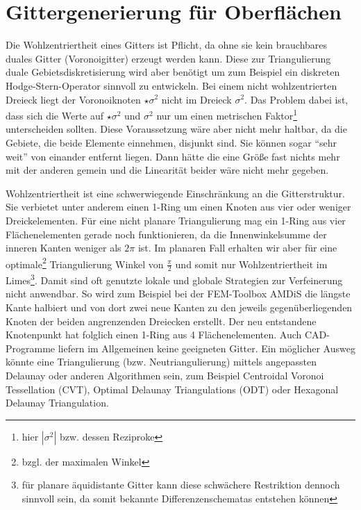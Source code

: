 \section{Gittergenerierung für Oberflächen}


  \begin{ziel}
    Die Wohlzentriertheit eines Gitters ist Pflicht, da ohne sie kein brauchbares duales Gitter (Voronoigitter) erzeugt werden kann. 
    Diese zur Triangulierung duale Gebietsdiskretisierung wird aber benötigt um zum Beispiel ein diskreten Hodge-Stern-Operator sinnvoll zu entwickeln. 
    Bei einem nicht wohlzentrierten Dreieck liegt der Voronoiknoten \( \star\sigma^{2} \) nicht im Dreieck \( \sigma^{2} \).
    Das Problem dabei ist, dass sich die Werte auf \( \star\sigma^{2} \) und \( \sigma^{2} \) nur um einen 
    metrischen Faktor\footnote{hier \( |\sigma^{2}| \) bzw. dessen Reziproke} unterscheiden sollten.
    Diese Voraussetzung wäre aber nicht mehr haltbar, da die Gebiete, die beide Elemente einnehmen, disjunkt sind. 
    Sie können sogar  "`sehr weit"'
    von einander entfernt liegen.
    Dann hätte die eine Größe fast nichts mehr mit der anderen gemein und die Linearität beider wäre nicht mehr gegeben.

    Wohlzentriertheit ist eine schwerwiegende Einschränkung an die Gitterstruktur. Sie verbietet unter anderem einen 1-Ring um einen Knoten aus vier oder weniger Dreickelementen.
    Für eine nicht planare Triangulierung mag ein 1-Ring aus vier Flächenelementen gerade noch funktionieren, da die Innenwinkelsumme der inneren Kanten weniger als \( 2\pi \) ist.
    Im planaren Fall erhalten wir aber für eine optimale\footnote{bzgl. der maximalen Winkel} Triangulierung Winkel von \( \frac{\pi}{2} \) 
    und somit nur Wohlzentriertheit im Limes\footnote{für planare äquidistante Gitter kann diese schwächere Restriktion dennoch sinnvoll sein, da somit bekannte Differenzenschematas entstehen können}.
    Damit sind oft genutzte lokale und globale Strategien zur Verfeinerung nicht anwendbar. 
    So wird zum Beispiel bei der FEM-Toolbox AMDiS \cite{amdis} die längste Kante halbiert und von dort zwei neue Kanten zu den jeweils gegenüberliegenden Knoten der beiden angrenzenden Dreiecken erstellt. Der neu entstandene Knotenpunkt hat folglich einen 1-Ring aus 4 Flächenelementen.
    Auch CAD-Programme liefern im Allgemeinen keine geeigneten Gitter. 
    Ein möglicher Ausweg könnte eine Triangulierung (bzw. Neutriangulierung) mittels angepassten Delaunay oder anderen Algorithmen sein, zum Beispiel Centroidal Voronoi Tessellation (CVT)\cite{CVTGunzburger}, 
    Optimal Delaunay Triangulations (ODT)\cite{ODT} oder Hexagonal Delaunay Triangulation\cite{HDT}.


\end{ziel}
